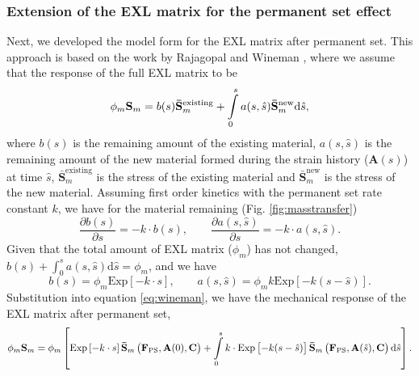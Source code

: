 
\subsubsection{Extension of the EXL matrix for the permanent set effect}

	Next, we developed the model form for the EXL matrix after permanent set. This approach is based on the work by Rajagopal and Wineman \cite{rajagopal_constitutive_1992}, where we assume that the response of the full EXL matrix to be 
\begin{equation} \label{eq:wineman}
\phi_m \mathbf{S}_m = b(s)\mathbf{\bar{S}}_m^\mathrm{existing} + \int\displaylimits_0^s a(s,\hat{s})\mathbf{\bar{S}}_m^\mathrm{new} \mathrm{d}\hat{s},
\end{equation}
    where $b(s)$ is the remaining amount of the existing material, $a(s,\hat{s})$ is the remaining amount of the new material formed during the strain history ($\mathbf{A}(s)$) at time $\hat{s}$, $\mathbf{\bar{S}}_m^\mathrm{existing}$ is the stress of the existing material and $\mathbf{\bar{S}}_m^\mathrm{new}$ is the stress of the new material. Assuming first order kinetics with the permanent set rate constant $k $, we have for the material remaining (Fig. \ref{fig:masstransfer})
\begin{equation}
\frac{\partial b(s)}{\partial s} = - k\cdot b(s), \qquad \frac{\partial a(s,\hat{s})}{\partial s} = - k \cdot a(s,\hat{s}).
\end{equation}
    Given that the total amount of EXL matrix ($\phi_m$) has not changed, $b(s) + \int_0^s a(s, \hat{s}) \mathrm{d}\hat{s} = \phi_m$, and we have
\begin{equation}
b(s) = \phi_m \mathrm{Exp}\left[-k  \cdot s\right], \qquad a(s,\hat{s}) = \phi_m k  \mathrm{Exp}\left[-k (s - \hat{s})\right].
\end{equation}
    Substitution into equation \ref{eq:wineman}, we have the mechanical response of the EXL matrix after permanent set,
\begin{equation}
\phi_m \mathbf{S}_m = \phi_m \left[\mathrm{Exp}\left[-k  \cdot s\right]\mathbf{\bar{S}}_m \left(\mathbf{F}_\mathrm{PS},\mathbf{A}(0),\mathbf{C}\right) + \int\displaylimits_0^s k \cdot \mathrm{Exp}\left[-k (s - \hat{s})\right] \mathbf{\bar{S}}_m \left(\mathbf{F}_\mathrm{PS},  \mathbf{A}(\hat{s}),\mathbf{C}\right) \mathrm{d}\hat{s} \right].
\end{equation}
